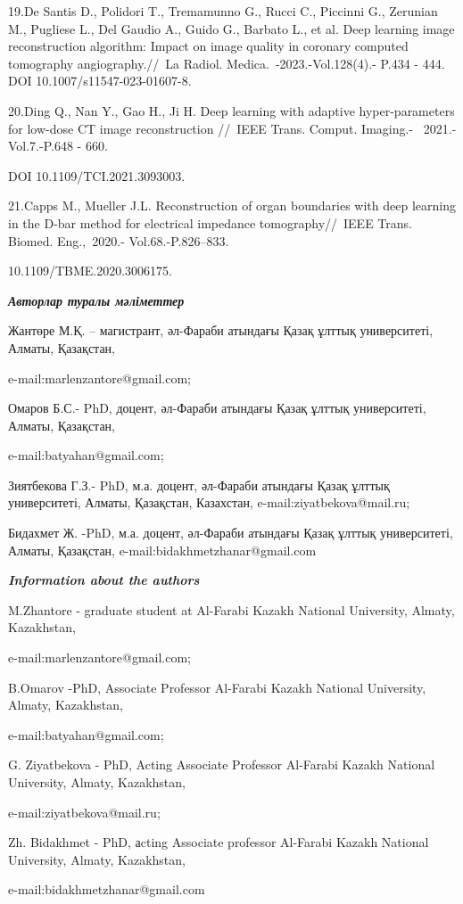 \begin{noparindent}
19.De Santis D., Polidori T., Tremamunno G., Rucci C., Piccinni G.,
Zerunian M., Pugliese L., Del Gaudio A., Guido G., Barbato L., et al.
Deep learning image reconstruction algorithm: Impact on image quality in
coronary computed tomography angiography.//~La Radiol.
Medica.~-2023.-Vol.128(4).- P.434 - 444. DOI
10.1007/s11547-023-01607-8.~

20.Ding Q., Nan Y., Gao H., Ji H. Deep learning with adaptive
hyper-parameters for low-dose CT image reconstruction //~IEEE Trans.
Comput. Imaging.- \emph{~}2021.-Vol.7.-P.648 - 660.

DOI 10.1109/TCI.2021.3093003.~

21.Capps M., Mueller J.L. Reconstruction of organ boundaries with deep
learning in the D-bar method for electrical impedance tomography//~IEEE
Trans. Biomed. Eng.,\emph{~}2020.- Vol.68.-P.826--833.

10.1109/TBME.2020.3006175.~
\end{noparindent}

\emph{{\bfseries Авторлар туралы мәліметтер}}

\begin{noparindent}
Жантөре М.Қ. -- магистрант, әл-Фараби атындағы Қазақ ұлттық
университеті, Алматы, Қазақстан,

e-mail:marlenzantore@gmail.com;

Омаров Б.С.- PhD, доцент, әл-Фараби атындағы Қазақ ұлттық университеті,
Алматы, Қазақстан,

e-mail:batyahan@gmail.com;

Зиятбекова Г.З.- PhD, м.а. доцент, әл-Фараби атындағы Қазақ ұлттық
университеті, Алматы, Қазақстан, Казахстан, e-mail:ziyatbekova@mail.ru;

Бидахмет Ж. -PhD, м.а. доцент, әл-Фараби атындағы Қазақ ұлттық
университеті, Алматы, Қазақстан, e-mail:bidakhmetzhanar@gmail.com
\end{noparindent}

\emph{{\bfseries Information about the authors}}

\begin{noparindent}
M.Zhantore - graduate student at Al-Farabi Kazakh National University,
Almaty, Kazakhstan,

e-mail:marlenzantore@gmail.com;

B.Omarov -PhD, Associate Professor Al-Farabi Kazakh National University,
Almaty, Kazakhstan,

e-mail:batyahan@gmail.com;

G. Ziyatbekova - PhD, Acting Associate Professor Al-Farabi Kazakh
National University, Almaty, Kazakhstan,

e-mail:ziyatbekova@mail.ru;

Zh. Bidakhmet - PhD, аcting Associate professor Al-Farabi Kazakh
National University, Almaty, Kazakhstan,

e-mail:bidakhmetzhanar@gmail.com
\end{noparindent}
